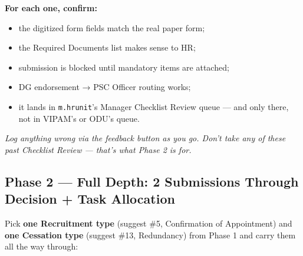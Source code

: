 \documentclass[
  11pt,
  letterpaper,
  DIV=11,
  numbers=noendperiod]{scrartcl}
\providecommand{\tightlist}{%
  \setlength{\itemsep}{0pt}\setlength{\parskip}{0pt}}
\begin{document}
\textbf{For each one, confirm:}

\begin{itemize}
\tightlist
\item
  the digitized form fields match the real paper form;
\item
  the Required Documents list makes sense to HR;
\item
  submission is blocked until mandatory items are attached;
\item
  DG endorsement → PSC Officer routing works;
\item
  it lands in \texttt{m.hrunit}'s Manager Checklist Review queue --- and
  only there, not in VIPAM's or ODU's queue.
\end{itemize}

\emph{Log anything wrong via the feedback button as you go. Don't take
any of these past Checklist Review --- that's what Phase 2 is for.}

\subsection{Phase 2 --- Full Depth: 2 Submissions Through Decision +
Task
Allocation}\label{phase-2-full-depth-2-submissions-through-decision-task-allocation}

Pick \textbf{one Recruitment type} (suggest \#5, Confirmation of
Appointment) and \textbf{one Cessation type} (suggest \#13, Redundancy)
from Phase 1 and carry them all the way through:
\end{document}
